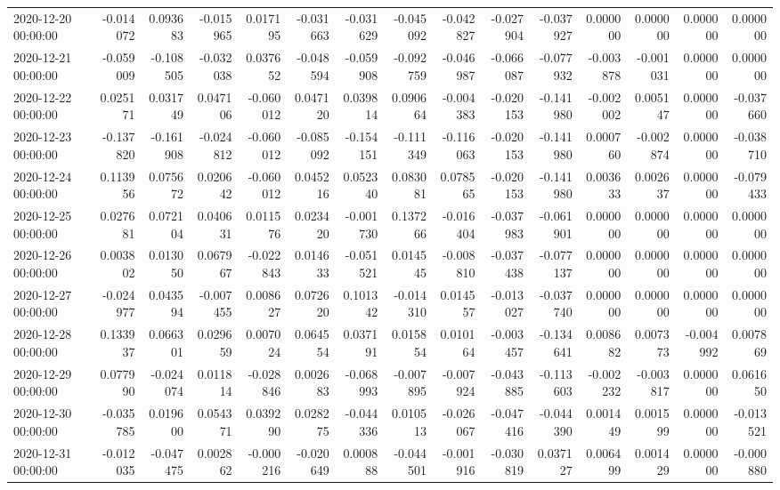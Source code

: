 \begin{tabular}{lrrrrrrrrrrrrrr}
2020-12-20 00:00:00 & -0.014072 & 0.093683 & -0.015965 & 0.017195 & -0.031663 & -0.031629 & -0.045092 & -0.042827 & -0.027904 & -0.037927 & 0.000000 & 0.000000 & 0.000000 & 0.000000 \\
2020-12-21 00:00:00 & -0.059009 & -0.108505 & -0.032038 & 0.037652 & -0.048594 & -0.059908 & -0.092759 & -0.046987 & -0.066087 & -0.077932 & -0.003878 & -0.001031 & 0.000000 & 0.000000 \\
2020-12-22 00:00:00 & 0.025171 & 0.031749 & 0.047106 & -0.060012 & 0.047120 & 0.039814 & 0.090664 & -0.004383 & -0.020153 & -0.141980 & -0.002002 & 0.005147 & 0.000000 & -0.037660 \\
2020-12-23 00:00:00 & -0.137820 & -0.161908 & -0.024812 & -0.060012 & -0.085092 & -0.154151 & -0.111349 & -0.116063 & -0.020153 & -0.141980 & 0.000760 & -0.002874 & 0.000000 & -0.038710 \\
2020-12-24 00:00:00 & 0.113956 & 0.075672 & 0.020642 & -0.060012 & 0.045216 & 0.052340 & 0.083081 & 0.078565 & -0.020153 & -0.141980 & 0.003633 & 0.002637 & 0.000000 & -0.079433 \\
2020-12-25 00:00:00 & 0.027681 & 0.072104 & 0.040631 & 0.011576 & 0.023420 & -0.001730 & 0.137266 & -0.016404 & -0.037983 & -0.061901 & 0.000000 & 0.000000 & 0.000000 & 0.000000 \\
2020-12-26 00:00:00 & 0.003802 & 0.013050 & 0.067967 & -0.022843 & 0.014633 & -0.051521 & 0.014545 & -0.008810 & -0.037438 & -0.077137 & 0.000000 & 0.000000 & 0.000000 & 0.000000 \\
2020-12-27 00:00:00 & -0.024977 & 0.043594 & -0.007455 & 0.008627 & 0.072620 & 0.101342 & -0.014310 & 0.014557 & -0.013027 & -0.037740 & 0.000000 & 0.000000 & 0.000000 & 0.000000 \\
2020-12-28 00:00:00 & 0.133937 & 0.066301 & 0.029659 & 0.007024 & 0.064554 & 0.037191 & 0.015854 & 0.010164 & -0.003457 & -0.134641 & 0.008682 & 0.007373 & -0.004992 & 0.007869 \\
2020-12-29 00:00:00 & 0.077990 & -0.024074 & 0.011814 & -0.028846 & 0.002683 & -0.068993 & -0.007895 & -0.007924 & -0.043885 & -0.113603 & -0.002232 & -0.003817 & 0.000000 & 0.061650 \\
2020-12-30 00:00:00 & -0.035785 & 0.019600 & 0.054371 & 0.039290 & 0.028275 & -0.044336 & 0.010513 & -0.026067 & -0.047416 & -0.044390 & 0.001449 & 0.001599 & 0.000000 & -0.013521 \\
2020-12-31 00:00:00 & -0.012035 & -0.047475 & 0.002862 & -0.000216 & -0.020649 & 0.000888 & -0.044501 & -0.001916 & -0.030819 & 0.037127 & 0.006499 & 0.001429 & 0.000000 & -0.000880 \\

\end{tabular}
